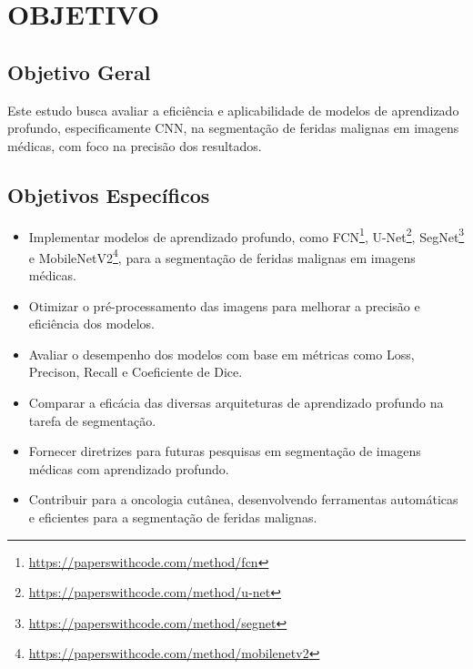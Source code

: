 \section{OBJETIVO}

\subsection{Objetivo Geral}

Este estudo busca avaliar a eficiência e aplicabilidade de modelos de aprendizado profundo, especificamente \ac{CNN}, na segmentação de feridas malignas em imagens médicas, com foco na precisão dos resultados.

\subsection{Objetivos Específicos}

\begin{itemize}
  \item Implementar modelos de aprendizado profundo, como \ac{FCN}\footnote{\url{https://paperswithcode.com/method/fcn}}, \ac{U-Net}\footnote{\url{https://paperswithcode.com/method/u-net}}, \ac{SegNet}\footnote{\url{https://paperswithcode.com/method/segnet}} e \ac{MobileNetV2}\footnote{\url{https://paperswithcode.com/method/mobilenetv2}}, para a segmentação de feridas malignas em imagens médicas.
  \item Otimizar o pré-processamento das imagens para melhorar a precisão e eficiência dos modelos.
  \item Avaliar o desempenho dos modelos com base em métricas como Loss, Precison, Recall e Coeficiente de Dice.
  \item Comparar a eficácia das diversas arquiteturas de aprendizado profundo na tarefa de segmentação.
  \item Fornecer diretrizes para futuras pesquisas em segmentação de imagens médicas com aprendizado profundo.
  \item Contribuir para a oncologia cutânea, desenvolvendo ferramentas automáticas e eficientes para a segmentação de feridas malignas.
\end{itemize}




